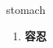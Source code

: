 
\begin{frame}
{\huge stomach}
\begin{center}
\begin{enumerate}\Large
  \item \textbf{容忍}
\end{enumerate}
\end{center}
\end{frame}
